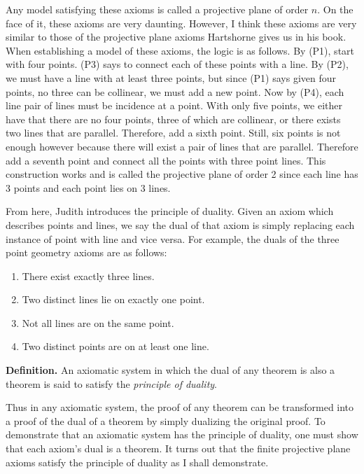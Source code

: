 \documentclass[12pt]{book}
\def\header #1{\noindent\textbf{#1}}
\begin{document}
Any model satisfying these axioms is called a projective plane of order $n$. On the face of it, these axioms are very daunting. However, I think these axioms are very similar to those of the projective plane axioms Hartshorne gives us in his book. When establishing a model of these axioms, the logic is as follows. By (P1), start with four points. (P3) says to connect each of these points with a line. By (P2), we must have a line with at least three points, but since (P1) says given four points, no three can be collinear, we must add a new point. Now by (P4), each line pair of lines must be incidence at a point. With only five points, we either have that there are no four points, three of which are collinear, or there exists two lines that are parallel. Therefore, add a sixth point. Still, six points is not enough however because there will exist a pair of lines that are parallel. Therefore add a seventh point and connect all the points with three point lines. This construction works and is called the projective plane of order 2 since each line has 3 points and each point lies on 3 lines.

From here, Judith introduces the principle of duality. Given an axiom which describes points and lines, we say the dual of that axiom is simply replacing each instance of point with line and vice versa. For example, the duals of the three point geometry axioms are as follows:\\

\begin{enumerate}[label=\textbf{Axiom \arabic*.}, nolistsep]
\item There exist exactly three lines.
\item Two distinct lines lie on exactly one point.
\item Not all lines are on the same point.
\item Two distinct points are on at least one line.\\
\end{enumerate}

\header{Definition.} An axiomatic system in which the dual of any theorem is also a theorem is said to satisfy the \textit{principle of duality}.

Thus in any axiomatic system, the proof of any theorem can be transformed into a proof of the dual of a theorem by simply dualizing the original proof. To demonstrate that an axiomatic system has the principle of duality, one must show that each axiom's dual is a theorem. It turns out that the finite projective plane axioms satisfy the principle of duality as I shall demonstrate.\\
\end{document}

